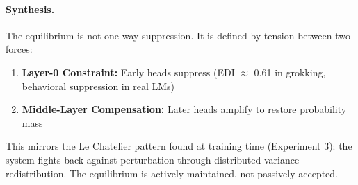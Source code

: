\paragraph{Synthesis.}
The equilibrium is not one-way suppression. It is defined by tension between two forces:
\begin{enumerate}
\item \textbf{Layer-0 Constraint:} Early heads suppress (EDI $\approx$ 0.61 in grokking, behavioral suppression in real LMs)
\item \textbf{Middle-Layer Compensation:} Later heads amplify to restore probability mass
\end{enumerate}

This mirrors the Le Chatelier pattern found at training time (Experiment 3): the system fights back against perturbation through distributed variance redistribution. The equilibrium is actively maintained, not passively accepted.
